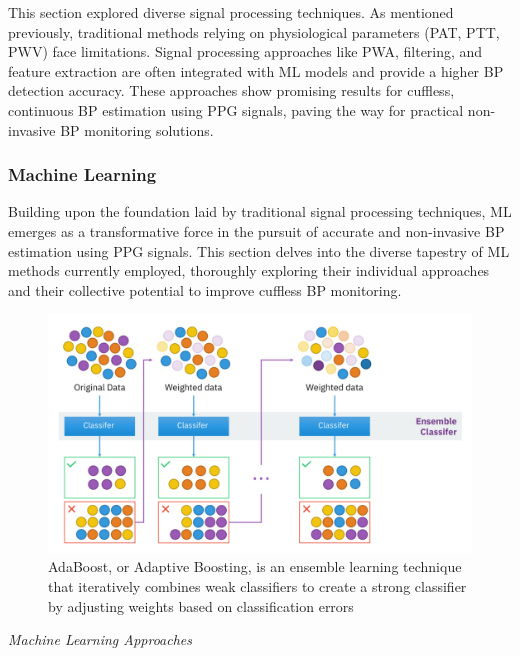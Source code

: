 \vspace{0.2cm}
This section explored diverse signal processing techniques.
As mentioned previously, traditional methods relying on physiological parameters (PAT, PTT, PWV) face limitations.
Signal processing approaches like PWA, filtering, and feature extraction are often integrated with ML models and provide a higher BP detection accuracy.
These approaches show promising results for cuffless, continuous BP estimation using PPG signals, paving the way for practical non-invasive BP monitoring solutions.

\subsubsection{Machine Learning}
\label{subsubsec:machine_learning}

Building upon the foundation laid by traditional signal processing techniques, ML emerges as a transformative force in the pursuit of accurate and non-invasive BP estimation using PPG signals.
This section delves into the diverse tapestry of ML methods currently employed, thoroughly exploring their individual approaches and their collective potential to improve cuffless BP monitoring.

\begin{figure}[h]
    \centering
    \includegraphics[scale=0.06]{images/ml/adaboost}
    \caption{\small AdaBoost, or Adaptive Boosting, is an ensemble learning technique that iteratively combines weak classifiers to create a strong classifier by adjusting weights based on classification errors~\cite{AdaBoostAlgorithmMachine}}
    \label{fig:adaboost}
\end{figure}

\vspace{0.2cm}
\textit{Machine Learning Approaches}
\vspace{0.2cm}

